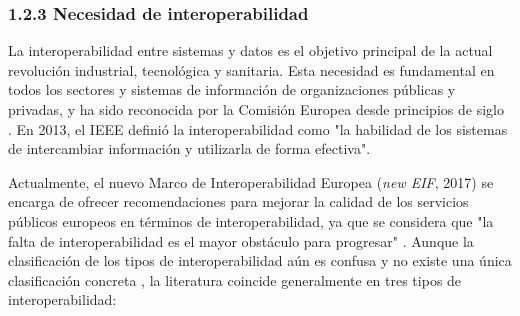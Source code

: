 \subsubsection{1.2.3 Necesidad de interoperabilidad}


La interoperabilidad entre sistemas y datos es el objetivo principal de la actual revolución industrial, tecnológica y sanitaria. Esta necesidad es fundamental en todos los sectores y sistemas de información de organizaciones públicas y privadas, y ha sido reconocida por la Comisión Europea desde principios de siglo \cite{CEU1999ida}. En 2013, el IEEE definió la interoperabilidad como "la habilidad de los sistemas de intercambiar información y utilizarla de forma efectiva". 

Actualmente, el nuevo Marco de Interoperabilidad Europea (\textit{new EIF}, 2017) se encarga de ofrecer recomendaciones para mejorar la calidad de los servicios públicos europeos en términos de interoperabilidad, ya que se considera que "la falta de interoperabilidad es el mayor obstáculo para progresar" \cite{kouroubali2019new}. Aunque la clasificación de los tipos de interoperabilidad aún es confusa y no existe una única clasificación concreta \cite{santos2021interoperability}, la literatura coincide generalmente en tres tipos de interoperabilidad:



